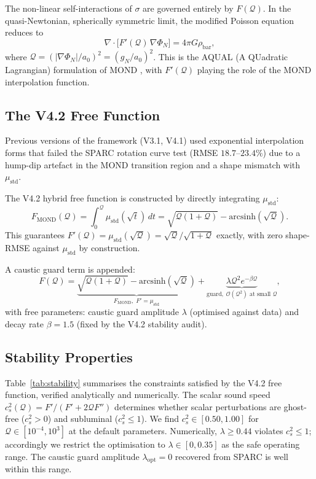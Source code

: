 \documentclass{aa}
\newcommand{\Q}{\mathcal{Q}}
\newcommand{\mstd}{\mu_\text{std}}
\newcommand{\Fmond}{F_\text{MOND}}
\newcommand{\gN}{g_N}
\newcommand{\azero}{a_0}
\newcommand{\cs}{c_s^2}
\newcommand{\lopt}{\lambda_\text{opt}}
\begin{document}
The non-linear self-interactions of $\sigma$ are governed entirely by $F(\Q)$.
In the quasi-Newtonian, spherically symmetric limit, the modified Poisson
equation reduces to
\begin{equation}
  \nabla \cdot \bigl[ F'(\Q)\,\nabla\Phi_N \bigr] = 4\pi G \rho_\text{bar},
\end{equation}
where $\Q = (|\nabla\Phi_N|/\azero)^2 = (\gN/\azero)^2$. This is the
AQUAL (A QUadratic Lagrangian) formulation of MOND \citep{Bekenstein1984},
with $F'(\Q)$ playing the role of the MOND interpolation function.

\subsection{The V4.2 Free Function}
\label{sec:freefunction}

Previous versions of the framework (V3.1, V4.1) used exponential interpolation
forms that failed the SPARC rotation curve test (RMSE $18.7$--$23.4\%$) due to
a hump-dip artefact in the MOND transition region and a shape mismatch
with $\mstd$.

The V4.2 hybrid free function is constructed by directly integrating $\mstd$:
\begin{equation}
  \Fmond(\Q) = \int_0^\Q \mstd(\sqrt{t})\,dt
             = \sqrt{\Q(1+\Q)} - \mathrm{arcsinh}(\sqrt{\Q}).
  \label{eq:fmond}
\end{equation}
This guarantees $F'(\Q) = \mstd(\sqrt{\Q}) = \sqrt{\Q}/\sqrt{1+\Q}$ exactly,
with zero shape-RMSE against $\mstd$ by construction.

A caustic guard term is appended:
\begin{equation}
  F(\Q) =
    \underbrace{\sqrt{\Q(1+\Q)} - \mathrm{arcsinh}(\sqrt{\Q})}_{\Fmond,\;
      F' = \mstd}
    +
    \underbrace{\lambda\Q^2 e^{-\beta\Q}}_{\text{guard},\;
      \mathcal{O}(\Q^2)\text{ at small }\Q},
  \label{eq:fv42}
\end{equation}
with free parameters: caustic guard amplitude $\lambda$ (optimised against
data) and decay rate $\beta = 1.5$ (fixed by the V4.2 stability audit).

\subsection{Stability Properties}
\label{sec:stability}

Table~\ref{tab:stability} summarises the constraints satisfied by the V4.2
free function, verified analytically and numerically. The scalar sound speed
$\cs(\Q) = F'/(F' + 2\Q F'')$ determines whether scalar perturbations are
ghost-free ($\cs > 0$) and subluminal ($\cs \leq 1$). We find
$\cs \in [0.50, 1.00]$ for $\Q \in [10^{-4}, 10^3]$ at the default parameters.
Numerically, $\lambda \geq 0.44$ violates $\cs \leq 1$; accordingly we restrict
the optimisation to $\lambda \in [0, 0.35]$ as the safe operating range. The
caustic guard amplitude $\lopt = 0$ recovered from SPARC is well within this
range.
\end{document}
